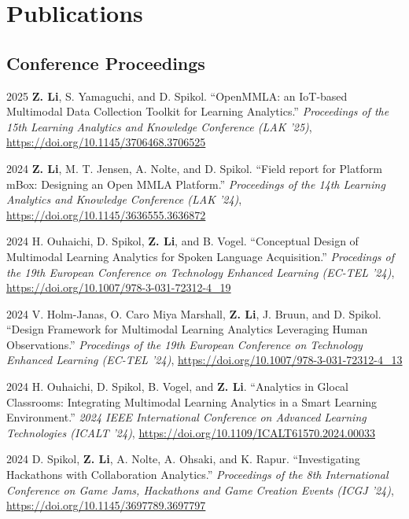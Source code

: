 \documentclass[11pt,letterpaper]{report}
\begin{document}
    \section*{Publications}

    \subsection*{Conference Proceedings}

    \begin{tablist}
        \item[2025] \tab{} \textbf{Z. Li}, S. Yamaguchi, and D. Spikol. \enquote{OpenMMLA: an IoT-based Multimodal Data Collection Toolkit for Learning Analytics.} \textit{Proceedings of the 15th Learning Analytics and Knowledge Conference (LAK '25)}, \href{https://doi.org/10.1145/3706468.3706525}{https://doi.org/10.1145/3706468.3706525}
        \item[2024] \tab{} \textbf{Z. Li}, M. T. Jensen, A. Nolte, and D. Spikol. \enquote{Field report for Platform mBox: Designing an Open MMLA Platform.} \textit{Proceedings of the 14th Learning Analytics and Knowledge Conference (LAK '24)}, \href{https://doi.org/10.1145/3636555.3636872}{https://doi.org/10.1145/3636555.3636872}
        \item[2024] \tab{} H. Ouhaichi, D. Spikol, \textbf{Z. Li}, and B. Vogel. \enquote{Conceptual Design of Multimodal Learning Analytics for Spoken Language Acquisition.} \textit{Procedings of the 19th European Conference on Technology Enhanced Learning (EC-TEL '24)}, \href{https://doi.org/10.1007/978-3-031-72312-4_19}{https://doi.org/10.1007/978-3-031-72312-4\_19}
        \item[2024] \tab{} V. Holm-Janas, O. Caro Miya Marshall, \textbf{Z. Li}, J. Bruun, and D. Spikol. \enquote{Design Framework for Multimodal Learning Analytics Leveraging Human Observations.} \textit{Procedings of the 19th European Conference on Technology Enhanced Learning (EC-TEL '24)}, \href{https://doi.org/10.1007/978-3-031-72312-4_13}{https://doi.org/10.1007/978-3-031-72312-4\_13}
        \item[2024] \tab{} H. Ouhaichi, D. Spikol, B. Vogel, and \textbf{Z. Li}. \enquote{Analytics in Glocal Classrooms: Integrating Multimodal Learning Analytics in a Smart Learning Environment.} \textit{2024 IEEE International Conference on Advanced Learning Technologies (ICALT '24)}, \href{https://doi.org/10.1109/ICALT61570.2024.00033}{https://doi.org/10.1109/ICALT61570.2024.00033}
        \item[2024] \tab{} D. Spikol, \textbf{Z. Li}, A. Nolte, A. Ohsaki, and K. Rapur. \enquote{Investigating Hackathons with Collaboration Analytics.} \textit{Proceedings of the 8th International Conference on Game Jams, Hackathons and Game Creation Events (ICGJ '24)}, \href{https://doi.org/10.1145/3697789.3697797}{https://doi.org/10.1145/3697789.3697797}
    \end{tablist}
\end{document}
